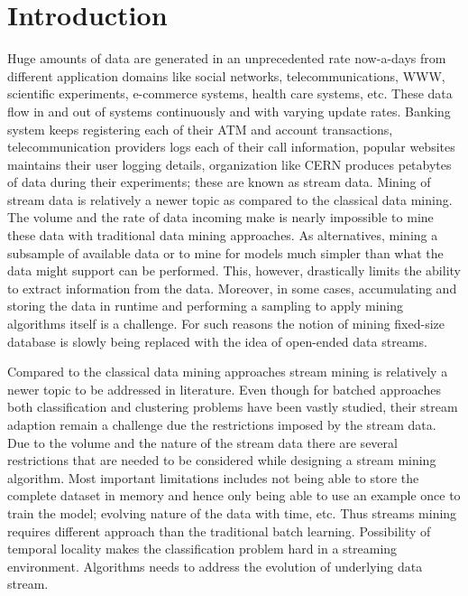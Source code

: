 \chapter{Introduction}
\label{chp:intro}
Huge amounts of data are generated in an unprecedented rate now-a-days from different application domains like social networks, telecommunications, WWW, scientific experiments, e-commerce systems, health care systems, etc. These data flow in and out of systems continuously and with varying update rates. Banking system keeps registering each of their ATM and account transactions, telecommunication providers logs each of their call information, popular websites maintains their user logging details, organization like CERN produces petabytes of data during their experiments; these are known as stream data. Mining of stream data is relatively a newer topic as compared to the classical data mining. The volume and the rate of data incoming make is nearly impossible to mine these data with traditional data mining approaches. As alternatives, mining a subsample of available data or to mine for models much simpler than what the data might support can be performed. This, however, drastically limits the ability to extract information from the data. Moreover, in some cases, accumulating and storing the data in runtime and performing a sampling to apply mining algorithms itself is a challenge. For such reasons the notion of mining fixed-size database is slowly being replaced with the idea of open-ended data streams.

Compared to the classical data mining approaches stream mining is relatively a newer topic to be addressed in literature. Even though for batched approaches both classification and clustering problems have been vastly studied, their stream adaption remain a challenge due the restrictions imposed by the stream data. Due to the volume and the nature of the stream data there are several restrictions that are needed to be considered while designing a stream mining algorithm. Most important limitations includes not being able to store the complete dataset in memory and hence only being able to use an example once to train the model; evolving nature of the data with time, etc. Thus streams mining requires different approach than the traditional batch learning. Possibility of temporal locality makes the classification problem hard in a streaming environment. Algorithms needs to address the evolution of underlying data stream.

